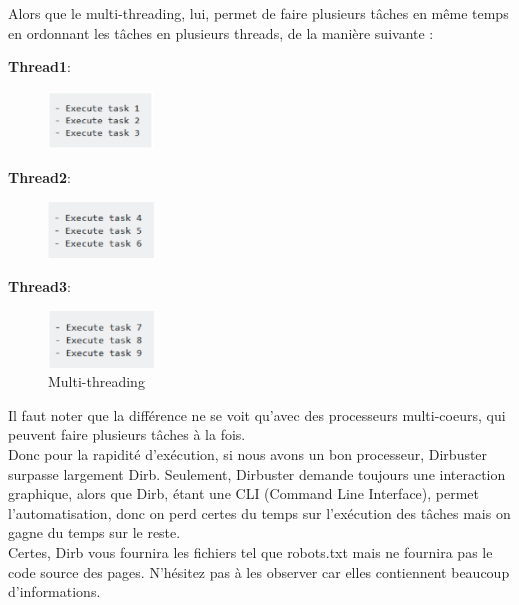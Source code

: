 \noindent Alors que le multi-threading, lui, permet de faire plusieurs tâches en même temps en ordonnant les tâches en plusieurs threads, de la manière suivante : 
\begin{center}
    \textbf{Thread1}:\\
       \begin{figure}[htp!]
  \centering
  \setlength\figureheight{7cm}
  \setlength\figurewidth{9cm}
  \includegraphics[width=0.25\textwidth]{oui/Ancien/imangeancien/dirb4.PNG}
  \label{fig:courbe-tikz}
\end{figure}
\textbf{Thread2}:\\
       \begin{figure}[htp!]
  \centering
  \setlength\figureheight{7cm}
  \setlength\figurewidth{9cm}
  \includegraphics[width=0.25\textwidth]{oui/Ancien/imangeancien/dirb5.PNG}
  \label{fig:courbe-tikz}
\end{figure}

\textbf{Thread3}:\\
       \begin{figure}[htp!]
  \centering
  \setlength\figureheight{7cm}
  \setlength\figurewidth{9cm}
  \includegraphics[width=0.25\textwidth]{oui/Ancien/imangeancien/dirb6.PNG}
  \caption{Multi-threading}
  \label{fig:courbe-tikz}
\end{figure}
\end{center}
Il faut noter que la différence ne se voit qu’avec des processeurs multi-coeurs, qui peuvent faire plusieurs tâches à la fois. \\
Donc pour la rapidité d’exécution, si nous avons un bon processeur, Dirbuster surpasse largement Dirb.
Seulement, Dirbuster demande toujours une interaction graphique, alors que Dirb, étant une CLI (Command Line Interface), permet l’automatisation, donc on perd certes du temps sur l’exécution des tâches mais on gagne du temps sur le reste.\\
Certes, Dirb vous fournira les fichiers tel que robots.txt mais ne fournira pas le code source des pages. N'hésitez pas à les observer car elles contiennent beaucoup d'informations. 